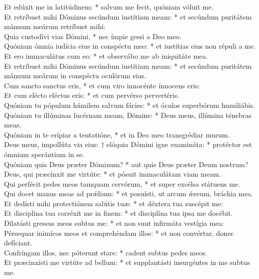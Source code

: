 {	Et edúxit me in latitúdinem: * salvum me fecit, quóniam vóluit me. \\
	Et retríbuet mihi Dóminus secúndum iustítiam meam: * et secúndum puritátem mánuum meárum retríbuet mihi: \\
	Quia custodívi vias Dómini, * nec ímpie gessi a Deo meo. \\
	Quóniam ómnia iudícia eius in conspéctu meo: * et iustítias eius non répuli a me. \\
	Et ero immaculátus cum eo: * et observábo me ab iniquitáte mea. \\
	Et retríbuet mihi Dóminus secúndum iustítiam meam: * et secúndum puritátem mánuum meárum in conspéctu oculórum eius. \\
	Cum sancto sanctus eris, * et cum viro innocénte ínnocens eris: \\
	Et cum elécto eléctus eris: * et cum pervérso pervertéris. \\
	Quóniam tu pópulum húmilem salvum fácies: * et óculos superbórum humiliábis. \\
	Quóniam tu illúminas lucérnam meam, Dómine: * Deus meus, illúmina ténebras meas. \\
	Quóniam in te erípiar a tentatióne, * et in Deo meo transgrédiar murum. \\
	Deus meus, impollúta via eius: † elóquia Dómini igne examináta: * protéctor est ómnium sperántium in se. \\
	Quóniam quis Deus præter Dóminum? * aut quis Deus præter Deum nostrum? \\
	Deus, qui præcínxit me virtúte: * et pósuit immaculátam viam meam. \\
	Qui perfécit pedes meos tamquam cervórum, * et super excélsa státuens me. \\
	Qui docet manus meas ad prǽlium: * et posuísti, ut arcum ǽreum, bráchia mea. \\
	Et dedísti mihi protectiónem salútis tuæ: * et déxtera tua suscépit me: \\
	Et disciplína tua corréxit me in finem: * et disciplína tua ipsa me docébit. \\
	Dilatásti gressus meos subtus me: * et non sunt infirmáta vestígia mea: \\
	Pérsequar inimícos meos et comprehéndam illos: * et non convértar, donec defíciant. \\
	Confríngam illos, nec póterunt stare: * cadent subtus pedes meos. \\
	Et præcinxísti me virtúte ad bellum: * et supplantásti insurgéntes in me subtus me. \\
}
